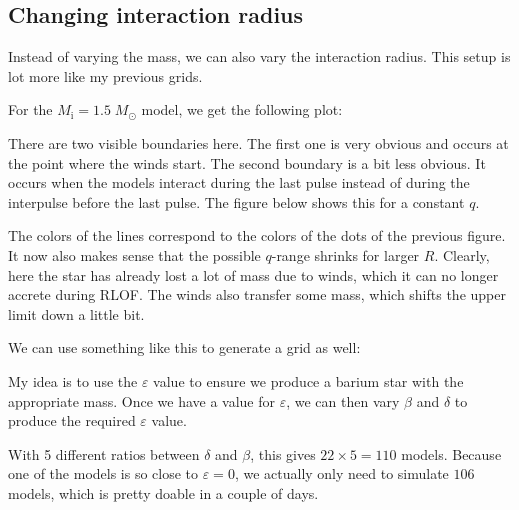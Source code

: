\documentclass[a4paper,10pt]{article}
\begin{document}
\subsection{Changing interaction radius}
Instead of varying the mass, we can also vary the interaction radius.
This setup is lot more like my previous grids.

For the \(M_\text{i} = 1.5\;M_\odot \) model, we get the following plot:
\begin{figure}[ht]
    \centering
\end{figure}

There are two visible boundaries here. The first one is very obvious and occurs at the point where the \citet{vassiliadis1993} winds start. The second boundary is a bit less obvious. It occurs when the models interact during the last pulse instead of during the interpulse before the last pulse. The figure below shows this for a constant \(q\).

\begin{figure}[ht]
    \centering
\end{figure}

The colors of the lines correspond to the colors of the dots of the previous figure.
It now also makes sense that the possible \(q\)-range shrinks for larger \(R\). Clearly, here the star has already lost a lot of mass due to winds, which it can no longer accrete during RLOF. The winds also transfer some mass, which shifts the upper limit down a little bit.

\nextpage

We can use something like this to generate a grid as well:

\begin{figure}[ht]
    \centering
\end{figure}

My idea is to use the \(\varepsilon \) value to ensure we produce a barium star with the appropriate mass. Once we have a value for \(\varepsilon \), we can then vary \(\beta \) and \(\delta \) to produce the required \(\varepsilon \) value.

With 5 different ratios between \(\delta \) and \(\beta \), this gives \(22\times 5 = 110\) models. Because one of the models is so close to \(\varepsilon = 0\), we actually only need to simulate \(106\) models, which is pretty doable in a couple of days.
\end{document}
